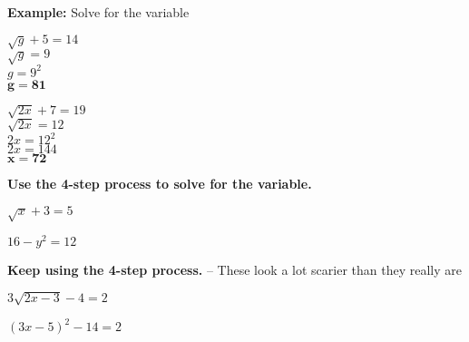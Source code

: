 \documentclass[12pt]{article}
\begin{document}
\textbf{Example:} Solve for the variable\\

\begin{multicols}{2}

$\sqrt{g}+5=14$\\

$\sqrt{g}=9$\\

$g=9^2$\\

$\mathbf{g=81}$\\

\vfill

\columnbreak

$\sqrt{2x}+7=19$\\

$\sqrt{2x}=12$\\

$2x=12^2$\\

$2x=144$\\

$\mathbf{x=72}$\\

\end{multicols}

\textbf{Use the 4-step process to solve for the variable.}\\

\begin{enumerate}
\begin{multicols}{2}
	\item $\sqrt{x}+3=5$\\
	
	
	\item $16-y^2=12$\\
\end{multicols}		
\end{enumerate}

\vspace{1in}

\textbf{Keep using the 4-step process.} -- These look a lot scarier than they really are\\


\begin{enumerate}[resume] 
\begin{multicols}{2}
	\item $3\sqrt{2x-3}-4=2$\\
	
		
	\item $(3x-5)^2-14=2$\\

\end{multicols}
\end{enumerate}
\end{document}
